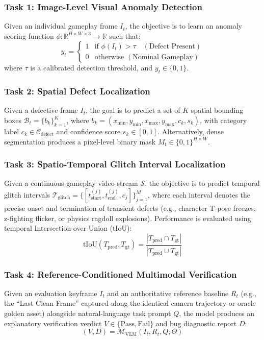 \documentclass[preprint,12pt,3p]{elsarticle}
\begin{document}
\subsubsection{Task 1: Image-Level Visual Anomaly Detection}
Given an individual gameplay frame $I_t$, the objective is to learn an anomaly scoring function $\phi: \mathbb{R}^{H \times W \times 3} \to \mathbb{R}$ such that:
\begin{equation}
y_t = \begin{cases} 
1 & \text{if } \phi(I_t) > \tau \quad (\text{Defect Present}) \\ 
0 & \text{otherwise } (\text{Nominal Gameplay}) 
\end{cases}
\end{equation}
where $\tau$ is a calibrated detection threshold, and $y_t \in \{0, 1\}$.

\subsubsection{Task 2: Spatial Defect Localization}
Given a defective frame $I_t$, the goal is to predict a set of $K$ spatial bounding boxes $\mathcal{B}_t = \{b_k\}_{k=1}^K$, where $b_k = (x_{\min}, y_{\min}, x_{\max}, y_{\max}, c_k, s_k)$, with category label $c_k \in \mathcal{C}_{\text{defect}}$ and confidence score $s_k \in [0, 1]$. Alternatively, dense segmentation produces a pixel-level binary mask $M_t \in \{0, 1\}^{H \times W}$.

\subsubsection{Task 3: Spatio-Temporal Glitch Interval Localization}
Given a continuous gameplay video stream $\mathcal{S}$, the objective is to predict temporal glitch intervals $\mathcal{T}_{\text{glitch}} = \{[t_{\text{start}}^{(j)}, t_{\text{end}}^{(j)}, c_j]\}_{j=1}^M$, where each interval denotes the precise onset and termination of transient defects (e.g., character T-pose freezes, z-fighting flicker, or physics ragdoll explosions). Performance is evaluated using temporal Intersection-over-Union ($\text{tIoU}$):
\begin{equation}
\text{tIoU}(T_{\text{pred}}, T_{\text{gt}}) = \frac{|T_{\text{pred}} \cap T_{\text{gt}}|}{|T_{\text{pred}} \cup T_{\text{gt}}|}
\end{equation}

\subsubsection{Task 4: Reference-Conditioned Multimodal Verification}
Given an evaluation keyframe $I_t$ and an authoritative reference baseline $R_t$ (e.g., the ``Last Clean Frame'' captured along the identical camera trajectory or oracle golden asset) alongside natural-language task prompt $Q$, the model produces an explanatory verification verdict $V \in \{\text{Pass}, \text{Fail}\}$ and bug diagnostic report $D$:
\begin{equation}
(V, D) = \mathcal{M}_{\text{VLM}}(I_t, R_t, Q; \Theta)
\end{equation}
\end{document}
